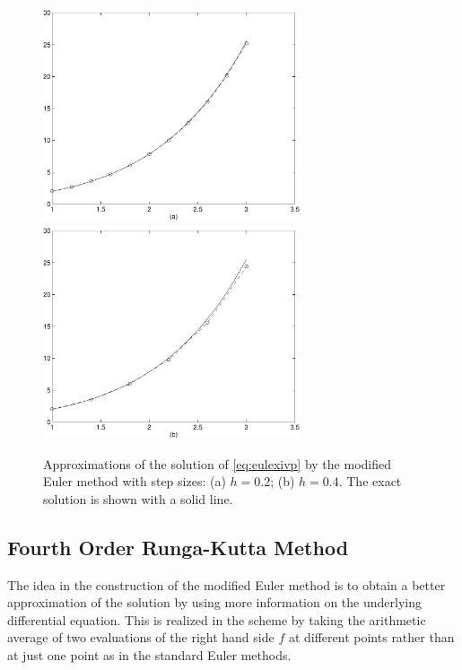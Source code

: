 \documentclass{ximera}
\begin{document}
\begin{figure}[htb]
   \centerline{%
   \includegraphics[width=3in]{../figures/meul1.pdf}
   \includegraphics[width=3in]{../figures/meul2.pdf}}
   \caption{Approximations of the solution of
   \protect\eqref{eq:eulexivp} by the modified Euler method
   with step sizes: (a) $h=0.2$; (b) $h=0.4$.
   The exact solution is shown with a solid line.}
   \label{fig:mEul}
\end{figure}

\subsection*{Fourth Order Runga-Kutta Method}

The idea in the construction of the modified Euler method is to obtain a 
better approximation of the solution by using more information on the 
underlying differential equation.  This is realized in the scheme by 
taking the arithmetic average of two evaluations of the right hand side 
$f$ at different points rather than at just one point as in the 
standard Euler methods.
\end{document}
